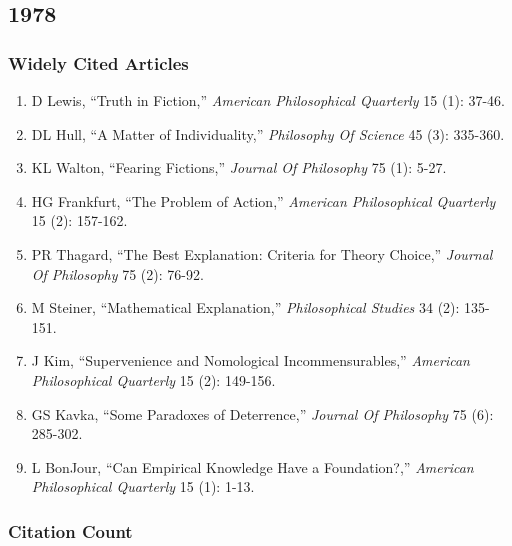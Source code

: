 \documentclass[
  10pt,
  letterpaper,
  DIV=11,
  numbers=noendperiod,
  twoside]{scrartcl}
\providecommand{\tightlist}{%
  \setlength{\itemsep}{0pt}\setlength{\parskip}{0pt}}\usepackage{longtable,booktabs,array}
\begin{document}
\newpage

\subsection{1978}\label{sec-s1978}

\subsubsection*{Widely Cited Articles}\label{widely-cited-articles-2}

\begin{enumerate}
\def\labelenumi{\arabic{enumi}.}
\tightlist
\item
  D Lewis, ``Truth in Fiction,'' \emph{American Philosophical Quarterly}
  15 (1): 37-46.
\item
  DL Hull, ``A Matter of Individuality,'' \emph{Philosophy Of Science}
  45 (3): 335-360.
\item
  KL Walton, ``Fearing Fictions,'' \emph{Journal Of Philosophy} 75 (1):
  5-27.
\item
  HG Frankfurt, ``The Problem of Action,'' \emph{American Philosophical
  Quarterly} 15 (2): 157-162.
\item
  PR Thagard, ``The Best Explanation: Criteria for Theory Choice,''
  \emph{Journal Of Philosophy} 75 (2): 76-92.
\item
  M Steiner, ``Mathematical Explanation,'' \emph{Philosophical Studies}
  34 (2): 135-151.
\item
  J Kim, ``Supervenience and Nomological Incommensurables,''
  \emph{American Philosophical Quarterly} 15 (2): 149-156.
\item
  GS Kavka, ``Some Paradoxes of Deterrence,'' \emph{Journal Of
  Philosophy} 75 (6): 285-302.
\item
  L BonJour, ``Can Empirical Knowledge Have a Foundation?,''
  \emph{American Philosophical Quarterly} 15 (1): 1-13.
\end{enumerate}

\subsubsection*{Citation Count}\label{sec-count-1978}
\end{document}
